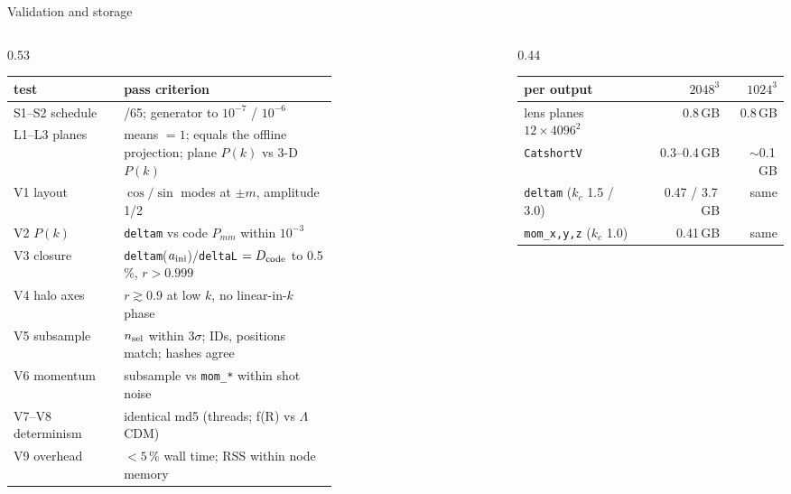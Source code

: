 \documentclass[UTF8]{beamer}
\begin{document}
\begin{frame}{Validation and storage}
  \footnotesize
  \begin{columns}[T,totalwidth=\textwidth]
    \begin{column}{0.53\textwidth}
      \scriptsize
      \setlength{\tabcolsep}{3pt}
      \begin{tabular}{@{}l>{\raggedright\arraybackslash}p{0.66\linewidth}@{}}
        \toprule
        test & pass criterion \\
        \midrule
        S1--S2 schedule & 65/65; generator to $10^{-7}$ / $10^{-6}$ \\
        L1--L3 planes & means $=1$; equals the offline projection; plane $P(k)$ vs 3-D $P(k)$ \\
        V1 layout & $\cos/\sin$ modes at $\pm m$, amplitude 1/2 \\
        V2 $P(k)$ & \texttt{deltam} vs code $P_{mm}$ within $10^{-3}$ \\
        V3 closure & \texttt{deltam}($a_{\rm ini}$)/\texttt{deltaL} $= D_{\rm code}$ to 0.5\,\%, $r > 0.999$ \\
        V4 halo axes & $r \gtrsim 0.9$ at low $k$, no linear-in-$k$ phase \\
        V5 subsample & $n_{\rm sel}$ within $3\sigma$; IDs, positions match; hashes agree \\
        V6 momentum & subsample vs \texttt{mom\_*} within shot noise \\
        V7--V8 determinism & identical md5 (threads; f(R) vs $\Lambda$CDM) \\
        V9 overhead & $< 5\,\%$ wall time; RSS within node memory \\
        \bottomrule
      \end{tabular}
    \end{column}
    \hfill
    \begin{column}{0.44\textwidth}
      \scriptsize
      \setlength{\tabcolsep}{3pt}
      \begin{tabular}{@{}lrr@{}}
        \toprule
        per output & $2048^3$ & $1024^3$ \\
        \midrule
        lens planes $12\times4096^2$ & 0.8\,GB & 0.8\,GB \\
        \texttt{CatshortV} & 0.3--0.4\,GB & $\sim$0.1\,GB \\
        \texttt{deltam} ($k_c$ 1.5 / 3.0) & 0.47 / 3.7\,GB & same \\
        \texttt{mom\_x,y,z} ($k_c$ 1.0) & 0.41\,GB & same \\

\end{tabular}
\end{column}
\end{columns}
\end{frame}
\end{document}
